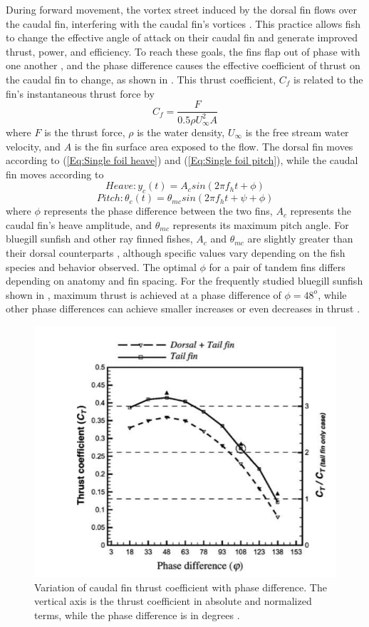     During forward movement, the vortex street induced by the dorsal fin flows over the caudal fin, interfering with the caudal fin’s vortices \citep{Drucker2001, Akhtar2007}. This practice allows fish to change the effective angle of attack on their caudal fin and generate improved thrust, power, and efficiency. To reach these goals, the fins flap out of phase with one another \citep{Drucker2001}, and the phase difference causes the effective coefficient of thrust on the caudal fin to change, as shown in . This thrust coefficient, \(C_f\) is related to the fin's instantaneous thrust force by \[C_f=\frac{F}{0.5\rho U_\infty^2 A}\] where \(F\) is the thrust force, \(\rho\) is the water density, \(U_\infty\) is the free stream water velocity, and \(A\) is the fin surface area exposed to the flow. The dorsal fin moves according to (\ref{Eq:Single foil heave}) and (\ref{Eq:Single foil pitch}), while the caudal fin moves according to
    \begin{equation}
Heave: y_c(t)=A_csin(2\pi f_h t+\phi)
\end{equation}
\begin{equation} \label{Eq:Caudal fin pitch}
Pitch: \theta_c (t)=\theta _{mc}sin(2\pi f_h t+\psi+\phi)
\end{equation}
    where \(\phi\) represents the phase difference between the two fins, \(A_c\) represents the caudal fin's heave amplitude, and \(\theta_{mc}\) represents its maximum pitch angle. For bluegill sunfish and other ray finned fishes, \(A_c\) and \(\theta_{mc}\) are slightly greater than their dorsal counterparts \citep{Drucker2001}, although specific values vary depending on the fish species and behavior observed. The optimal \(\phi\) for a pair of tandem fins differs depending on anatomy and fin spacing. For the frequently studied bluegill sunfish shown in , maximum thrust is achieved at a phase difference of $\phi=48^o$, while other phase differences can achieve smaller increases or even decreases in thrust \citep{Akhtar2007}.

\begin{figure}
\begin{center}
\includegraphics[width=0.49\columnwidth]{figures/Figure2.png}
\end{center}
\caption{Variation of caudal fin thrust coefficient with phase difference. The vertical axis is the thrust coefficient in absolute and normalized terms, while the phase difference is in degrees \citep{Akhtar2007}.}
\label{fig:app:Fish Thrust}
\end{figure}

